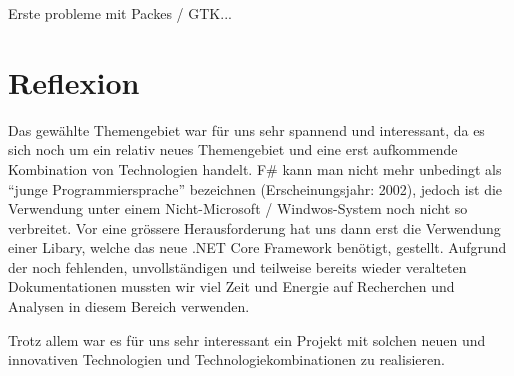 Erste probleme mit Packes / GTK...


\section{Reflexion}
Das gewählte Themengebiet war für uns sehr spannend und interessant, da es sich noch um ein relativ neues Themengebiet und eine erst aufkommende Kombination von Technologien handelt. F\# kann man nicht mehr unbedingt als "`junge Programmiersprache"' bezeichnen (Erscheinungsjahr: 2002), jedoch ist die Verwendung unter einem Nicht-Microsoft / Windwos-System noch nicht so verbreitet. Vor eine grössere Herausforderung hat uns dann erst die Verwendung einer Libary, welche das neue .NET Core Framework benötigt, gestellt. Aufgrund der noch fehlenden, unvollständigen und teilweise bereits wieder veralteten Dokumentationen mussten wir viel Zeit und Energie auf Recherchen und Analysen in diesem Bereich verwenden.


Trotz allem war es für uns sehr interessant ein Projekt mit solchen neuen und innovativen Technologien und Technologiekombinationen zu realisieren. 